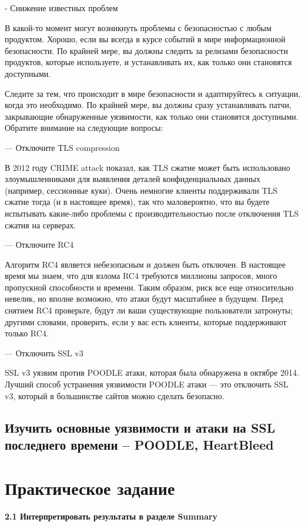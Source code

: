 \documentclass[10pt,a4paper]{article}
\begin{document}
- Снижение известных проблем

В какой-то момент могут возникнуть проблемы с безопасностью с любым продуктом. Хорошо, если вы всегда в курсе событий в мире информационной безопасности. По крайней мере, вы должны следить за релизами безопасности продуктов, которые используете, и устанавливать их, как только они становятся доступными.

Следите за тем, что происходит в мире безопасности и адаптируйтесь к ситуации, когда это необходимо. По крайней мере, вы должны сразу устанавливать патчи, закрывающие обнаруженные уязвимости, как только они становятся доступными. Обратите внимание на следующие вопросы:

— Отключите TLS compression

В 2012 году CRIME attack показал, как TLS сжатие может быть использовано злоумышленниками для выявления деталей конфиденциальных данных (например, сессионные куки). Очень немногие клиенты поддерживали TLS сжатие тогда (и в настоящее время), так что маловероятно, что вы будете испытывать какие-либо проблемы с производительностью после отключения TLS сжатия на серверах. 

— Отключите RC4

Алгоритм RC4 является небезопасным и должен быть отключен. В настоящее время мы знаем, что для взлома RC4 требуются миллионы запросов, много пропускной способности и времени. Таким образом, риск все еще относительно невелик, но вполне возможно, что атаки будут масштабнее в будущем. Перед снятием RC4 проверьте, будут ли ваши существующие пользователи затронуты; другими словами, проверить, если у вас есть клиенты, которые поддерживают только RC4.

— Отключить SSL v3

SSL v3 уязвим против POODLE атаки, которая была обнаружена в октябре 2014. Лучший способ устранения уязвимости POODLE атаки — это отключить SSL v3, который в большинстве сайтов можно сделать безопасно.

\subsection{Изучить основные уязвимости и атаки на SSL последнего времени – POODLE, HeartBleed}

\section{Практическое задание}

\paragraph{2.1 Интерпретировать результаты в разделе Summary }
\end{document}

